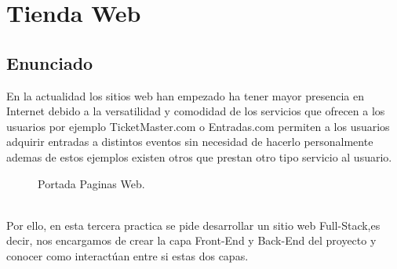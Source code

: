 \chapter{Tienda Web}
\section{Enunciado}
En la actualidad los sitios web han empezado ha tener mayor presencia en Internet debido a la versatilidad y comodidad de los servicios que ofrecen a los usuarios por ejemplo TicketMaster.com o Entradas.com permiten a los usuarios adquirir entradas a distintos eventos sin necesidad de hacerlo personalmente ademas de estos ejemplos existen otros que prestan otro tipo servicio al usuario.
\begin{figure}[!h]    
\centering
{}\hspace{1mm}
\caption{Portada Paginas Web.}
\label{fig:Portadas_Web.}
\end{figure}
\\Por ello, en esta tercera practica se pide desarrollar un sitio web Full-Stack,es decir, nos encargamos de crear la capa Front-End y Back-End del proyecto y conocer como interactúan entre si estas dos capas.
